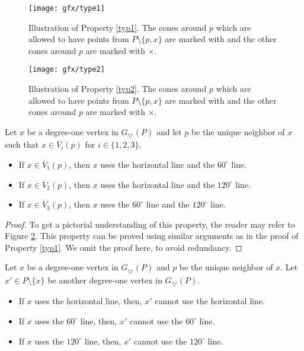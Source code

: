 \begin{figure}[h]
\centering
 \texttt{[image: gfx/type1]}   %
  \caption{Illustration of Property \ref{typ1}. The cones around $p$ which are allowed to have points from $P \setminus \{p, x\}$ are 
marked with \checkmark and the other cones 
around $p$ are marked with $\times$.}
\label{type1}
\end{figure}
\begin{figure}[h]
\centering
 \texttt{[image: gfx/type2]}   %
  \caption{Illustration of Property \ref{typ2}. The cones around $p$ which are allowed to have points from $P \setminus \{p, x\}$ are marked 
with \checkmark and the other cones 
around $p$ are marked with $\times$.}
\label{type2}
\end{figure}
\begin{property}\label{typ2}
 Let $x$ be a degree-one vertex in $G_\bigtriangledown(P)$ and let $p$ be the unique neighbor of $x$ such that $x \in \overline V_i(p)$ 
for $i \in \{1, 2, 3\}$. 
 \begin{itemize}
 \item If $x \in \overline V_1(p)$, then $x$ uses the horizontal line and the $60^\circ$ line.
 \item If $x \in \overline V_2(p)$, then $x$ uses the horizontal line and the $120^\circ$ line.
 \item If $x \in \overline V_3(p)$, then $x$ uses the $60^\circ$ line and the $120^\circ$ line.
\end{itemize}
\end{property}
\begin{proof}
To get a pictorial understanding of this property, the reader may refer to Figure \ref{type2}. 
This property can be proved using similar arguments as in the proof of Property \ref{typ1}. We omit the proof here, to avoid redundancy.  
\end{proof}
\begin{property}\label{uniqueline}
Let $x$ be a degree-one vertex in $G_\bigtriangledown(P)$ and $p$ be the unique neighbor of $x$. Let $x'\in P\setminus \{x\}$ be another 
degree-one vertex in $G_\bigtriangledown(P)$.
\begin{itemize}
 \item If $x$ uses the horizontal line, then, $x'$ cannot use the horizontal line.
\item If $x$ uses the $60^\circ$ line, then, $x'$ cannot use the $60^\circ$ line.
\item If $x$ uses the $120^\circ$ line, then, $x'$ cannot use the $120^\circ$ line.
 \end{itemize}
\end{property}
